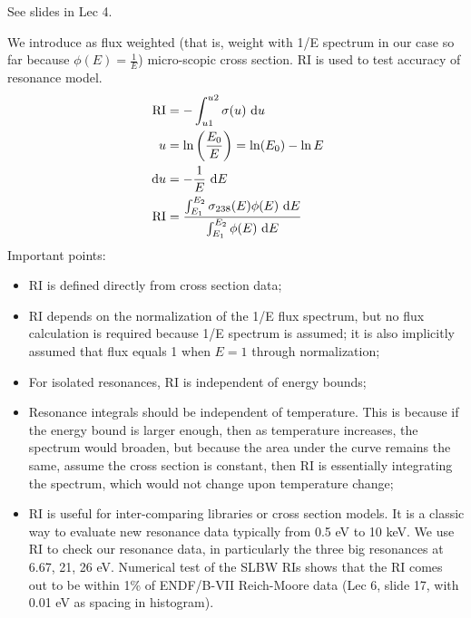 \documentclass{school-22.211-notes}
\date{February 22, 2012}
\begin{document}
\maketitle

See slides in Lec 4. 

We introduce  as flux weighted (that is, weight with 1/E spectrum in our case so far because $\phi(E) = \frac{1}{E}$) micro-scopic cross section. RI is used to test accuracy of resonance model. 
\begin{align}
\mathrm{RI} &=  - \int_{u1}^{u2} \sigma(u) \mbox{ }\mathrm{d} u \\
u &= \ln \left( \frac{E_0}{E} \right) = \ln(E_0) - \ln E \\
\mbox{ }\mathrm{d} u &= - \frac{1}{E} \mbox{ }\mathrm{d} E \\ 
\mathrm{RI} &=  \frac{\int_{E_1}^{E_2} \sigma_{238} (E) \phi(E) \mbox{ }\mathrm{d} E}{\int_{E_1}^{E_2} \phi (E) \mbox{ }\mathrm{d} E }  \\
\end{align}
Important points:
\begin{itemize}
\item RI is defined directly from cross section data;
\item RI depends on the normalization of the 1/E flux spectrum, but no flux calculation is required because 1/E spectrum is assumed; it is also implicitly assumed that flux equals 1 when $E = 1$ through normalization;
\item For isolated resonances, RI is independent of energy bounds; 
\item Resonance integrals should be independent of temperature. This is because if the energy bound is larger enough, then as temperature increases, the spectrum would broaden, but because the area under the curve remains the same, assume the cross section is constant, then RI is essentially integrating the spectrum, which would not change upon temperature change;
\item RI is useful for inter-comparing libraries or cross section models. It is a classic way to evaluate new resonance data typically from 0.5 eV to 10 keV. We use RI to check our resonance data, in particularly the three big resonances at 6.67, 21, 26 eV. Numerical test of the SLBW RIs shows that the RI comes out to be within 1\% of ENDF/B-VII Reich-Moore data (Lec 6, slide 17, with 0.01 eV as spacing in histogram). 
\end{itemize}
\end{document}
